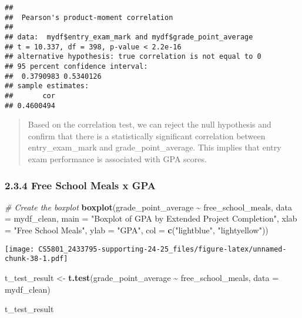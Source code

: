 \documentclass[
]{article}
\newenvironment{Shaded}{\begin{snugshade}}{\end{snugshade}}
\newcommand{\AttributeTok}[1]{\textcolor[rgb]{0.13,0.29,0.53}{#1}}
\newcommand{\CommentTok}[1]{\textcolor[rgb]{0.56,0.35,0.01}{\textit{#1}}}
\newcommand{\FunctionTok}[1]{\textcolor[rgb]{0.13,0.29,0.53}{\textbf{#1}}}
\newcommand{\NormalTok}[1]{#1}
\newcommand{\OtherTok}[1]{\textcolor[rgb]{0.56,0.35,0.01}{#1}}
\newcommand{\SpecialCharTok}[1]{\textcolor[rgb]{0.81,0.36,0.00}{\textbf{#1}}}
\newcommand{\StringTok}[1]{\textcolor[rgb]{0.31,0.60,0.02}{#1}}
\begin{document}
\begin{Shaded}
\end{Shaded}

\begin{verbatim}
## 
##  Pearson's product-moment correlation
## 
## data:  mydf$entry_exam_mark and mydf$grade_point_average
## t = 10.337, df = 398, p-value < 2.2e-16
## alternative hypothesis: true correlation is not equal to 0
## 95 percent confidence interval:
##  0.3790983 0.5340126
## sample estimates:
##       cor 
## 0.4600494
\end{verbatim}

\begin{quote}
Based on the correlation test, we can reject the null hypothesis and
confirm that there is a statistically significant correlation between
entry\_exam\_mark and grade\_point\_average. This implies that entry
exam performance is associated with GPA scores.
\end{quote}

\subsubsection{2.3.4 Free School Meals x
GPA}\label{free-school-meals-x-gpa}

\begin{Shaded}
\begin{Highlighting}[]
\CommentTok{\# Create the boxplot}
\FunctionTok{boxplot}\NormalTok{(grade\_point\_average }\SpecialCharTok{\textasciitilde{}}\NormalTok{ free\_school\_meals, }
        \AttributeTok{data =}\NormalTok{ mydf\_clean, }
        \AttributeTok{main =} \StringTok{"Boxplot of GPA by Extended Project Completion"}\NormalTok{,}
        \AttributeTok{xlab =} \StringTok{"Free School Meals"}\NormalTok{,}
        \AttributeTok{ylab =} \StringTok{"GPA"}\NormalTok{,}
        \AttributeTok{col =} \FunctionTok{c}\NormalTok{(}\StringTok{"lightblue"}\NormalTok{, }\StringTok{"lightyellow"}\NormalTok{))}
\end{Highlighting}
\end{Shaded}

\texttt{[image: CS5801\_2433795-supporting-24-25\_files/figure-latex/unnamed-chunk-38-1.pdf]}

\begin{Shaded}
\begin{Highlighting}[]
\NormalTok{t\_test\_result }\OtherTok{\textless{}{-}} \FunctionTok{t.test}\NormalTok{(grade\_point\_average }\SpecialCharTok{\textasciitilde{}}\NormalTok{ free\_school\_meals, }\AttributeTok{data =}\NormalTok{ mydf\_clean)}

\NormalTok{t\_test\_result}
\end{Highlighting}
\end{Shaded}
\end{document}
